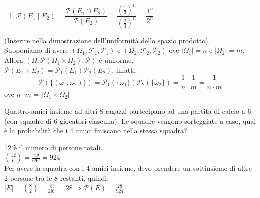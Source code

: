 \documentclass[12pt]{report}
\newcounter{exercise}
\begin{document}
\begin{exercise}{}{}
\begin{enumerate}
			Notiamo che $F_1 \subset E_1$ e $|F_1| = |E_1| - |E_1 \backslash F_1|$ \\
			$E_1 \backslash F_1$ è  urna 1 e 2 vuota oppure urna 1 e 3 vuote \\
			$E_1 \backslash F_1 = \{(3, 3, \dots, 3), (2, 2, \dots, 2)\}$ quindi $|E_1 \backslash F_1| = 2$ \\
			$|F_1| = 2^n - 2$ \\
			$\mathcal{P}(F_1) = \dfrac{2^n - 2}{3^{n-1}}$
			\item $\mathcal{P}(E_1 \mid E_2) = \dfrac{\mathcal{P}(E_1 \cap E_2)}{\mathcal{P}(E_2)} = \dfrac{(\frac{1}{3})^n}{(\frac{2}{3})^n} = \dfrac{1^n}{2^n}$

		\end{enumerate}
	\end{exercise}
	\begin{exercise}{}{}
			(Inserire nella dimostrazione dell'uniformità dello spazio prodotto) \\
			Supponiamo di avere $(\Omega_1, \mathcal{F}_1, \mathcal{P}_1)$ e $(\Omega_2, \mathcal{F}_2, \mathcal{P}_2)$ ove $|\Omega_1| = n$ e $|\Omega_2| = m$. \\
			Allora $(\Omega, \mathcal{P}(\Omega_1 \times \Omega_2), \mathcal{P})$ è uniforme. \\
			$\mathcal{P}(E_1 \times E_2) = \mathcal{P}_1(E_1)\mathcal{P}_2(E_2)$, infatti:
			\[
			\mathcal{P}(\{(\omega_1, \omega_2)\}) = \mathcal{P}_1(\{\omega_1\})\mathcal{P}_2(\{\omega_2\}) = \frac{1}{n} \cdot \frac{1}{m} = \frac{1}{n\cdot m}
			\]
			ove $n \cdot m$ = $|\Omega_1 \times \Omega_2|$
	\end{exercise}
	\begin{exercise}{}{}
		\begin{assignment}{}{}
			Quattro amici insieme ad altri 8 ragazzi partecipano ad una partita di calcio a 6 (con squadre di 6 giocatori ciascuna). Le squadre vengono sorteggiate a caso, qual è la probabilità che i 4 amici finiscano nella stessa squadra?
		\end{assignment}
		12 è il numero di persone totali. \\
		$\binom{12}{6} = \frac{12!}{6!6!} = 924$ \\
		Per avere la squadra con i 4 amici insieme, devo prendere un sottinsieme di altre 2 persone tra le 8 restanti, quindi: \\
		$|E| = \binom{8}{2} = \frac{8!}{2!6!} = 28 \Rightarrow \mathcal{P}(E) = \frac{28}{924}$
	\end{exercise}
\end{document}
